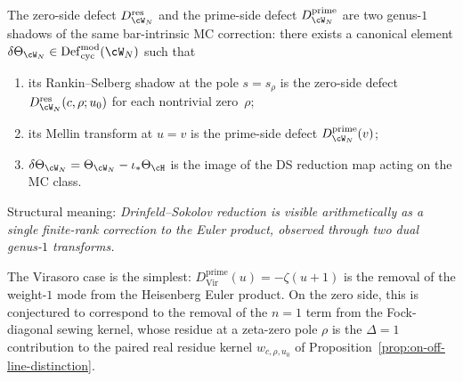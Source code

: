 \begin{conjecture}%
\label{conj:defect-unification}%
\ClaimStatusConjectured%
%
The zero-side defect $D_{\cW_N}^{\mathrm{res}}$ and the
prime-side defect $D_{\cW_N}^{\mathrm{prime}}$ are two
genus-$1$ shadows of the same bar-intrinsic MC
correction\textup{:}
there exists a canonical element
$\delta\Theta_{\cW_N} \in
\mathrm{Def}_{\mathrm{cyc}}^{\mathrm{mod}}(\cW_N)$
such that
\begin{enumerate}[label=\textup{(\roman*)}]
\item
its Rankin--Selberg shadow at the pole $s = s_\rho$
is the zero-side defect $D_{\cW_N}^{\mathrm{res}}(c,\rho;u_0)$
for each nontrivial zero~$\rho$\textup;
\item
its Mellin transform at $u = v$ is the prime-side defect
$D_{\cW_N}^{\mathrm{prime}}(v)$\textup;
\item
$\delta\Theta_{\cW_N} = \Theta_{\cW_N} - \iota_*\Theta_\cH$
is the image of the DS reduction map acting on the MC class.
\end{enumerate}
Structural meaning: \emph{Drinfeld--Sokolov reduction
is visible arithmetically as a single finite-rank correction
to the Euler product, observed through two dual genus-$1$
transforms.}
\end{conjecture}

\begin{remark}%
\label{rem:virasoro-first-miura-defect}%
%
The Virasoro case is the simplest:
$D_{\mathrm{Vir}}^{\mathrm{prime}}(u) = -\zeta(u{+}1)$
is the removal of the weight-$1$ mode from the Heisenberg
Euler product.
On the zero side, this is conjectured to correspond to the removal
of the $n = 1$ term from the Fock-diagonal sewing kernel,
whose residue at a zeta-zero pole $\rho$ is the $\Delta = 1$
contribution to the paired real residue kernel
$w_{c,\rho,u_0}$ of
Proposition~\ref{prop:on-off-line-distinction}.
\end{remark}

